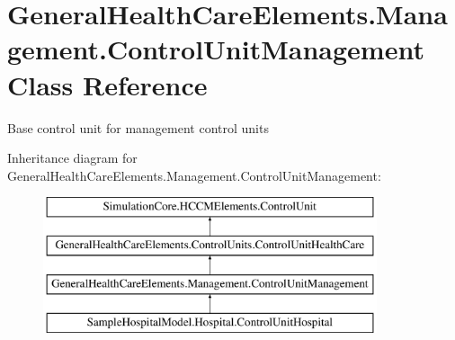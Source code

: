 \hypertarget{class_general_health_care_elements_1_1_management_1_1_control_unit_management}{}\section{General\+Health\+Care\+Elements.\+Management.\+Control\+Unit\+Management Class Reference}
\label{class_general_health_care_elements_1_1_management_1_1_control_unit_management}


Base control unit for management control units  


Inheritance diagram for General\+Health\+Care\+Elements.\+Management.\+Control\+Unit\+Management\+:\begin{figure}[H]
\begin{center}
\leavevmode
\includegraphics[height=4.000000cm]{class_general_health_care_elements_1_1_management_1_1_control_unit_management}
\end{center}
\end{figure}
